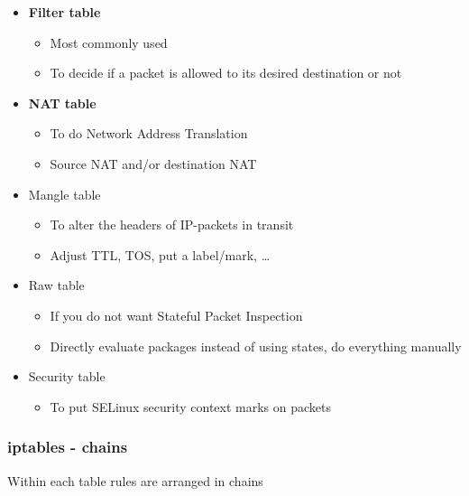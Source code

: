 \documentclass{article}
\begin{document}
\begin{itemize}
    \item \textbf{Filter table}
    \begin{itemize}
        \item Most commonly used
        \item To decide if a packet is allowed to its desired destination or not
    \end{itemize}
    \item \textbf{NAT table}
    \begin{itemize}
        \item To do Network Address Translation
        \item Source NAT and/or destination NAT
    \end{itemize}
    \item Mangle table
    \begin{itemize}
        \item To alter the headers of IP-packets in transit
        \item Adjust TTL, TOS, put a label/mark, \dots
    \end{itemize}
    \item Raw table
    \begin{itemize}
        \item If you do not want Stateful Packet Inspection
        \item Directly evaluate packages instead of using states, do everything manually
    \end{itemize}
    \item Security table
    \begin{itemize}
        \item To put SELinux security context marks on packets
    \end{itemize}
\end{itemize}

\subsubsection{iptables - chains}

Within each table rules are arranged in chains
\end{document}
